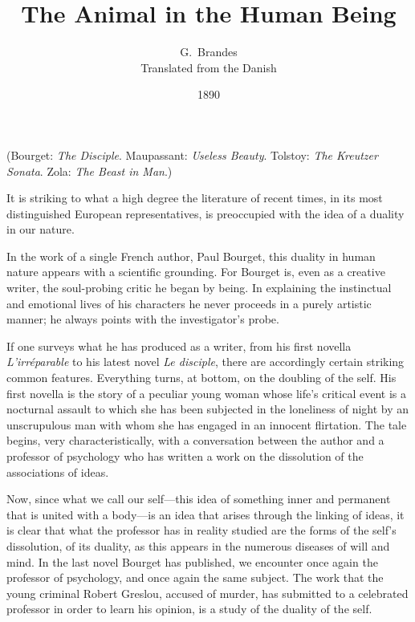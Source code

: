 \documentclass[12pt,a4paper]{article}
\title{\textbf{The Animal in the Human Being}}
\author{G.\ Brandes\\[4pt]
  \small Translated from the Danish}
\date{1890}
\begin{document}
\maketitle
\thispagestyle{fancy}

\begin{center}
  \small (Bourget: \textit{The Disciple}. Maupassant: \textit{Useless Beauty}.
  Tolstoy: \textit{The Kreutzer Sonata}. Zola: \textit{The Beast in Man}.)
\end{center}

\bigskip

It is striking to what a high degree the literature of recent times,
in its most distinguished European representatives, is preoccupied
with the idea of a duality in our nature.

In the work of a single French author, Paul Bourget, this duality in
human nature appears with a scientific grounding. For Bourget is, even
as a creative writer, the soul-probing critic he began by being. In
explaining the instinctual and emotional lives of his characters he
never proceeds in a purely artistic manner; he always points with the
investigator's probe.

If one surveys what he has produced as a writer, from his first novella
\textit{L'irréparable} to his latest novel \textit{Le disciple}, there
are accordingly certain striking common features. Everything turns, at
bottom, on the doubling of the self. His first novella is the story of
a peculiar young woman whose life's critical event is a nocturnal
assault to which she has been subjected in the loneliness of night by
an unscrupulous man with whom she has engaged in an innocent flirtation.
The tale begins, very characteristically, with a conversation between
the author and a professor of psychology who has written a work on the
dissolution of the associations of ideas.

Now, since what we call our self---this idea of something inner and
permanent that is united with a body---is an idea that arises through
the linking of ideas, it is clear that what the professor has in
reality studied are the forms of the self's dissolution, of its
duality, as this appears in the numerous diseases of will and mind. In
the last novel Bourget has published, we encounter once again the
professor of psychology, and once again the same subject. The work that
the young criminal Robert Greslou, accused of murder, has submitted to
a celebrated professor in order to learn his opinion, is a study of the
duality of the self.
\end{document}
